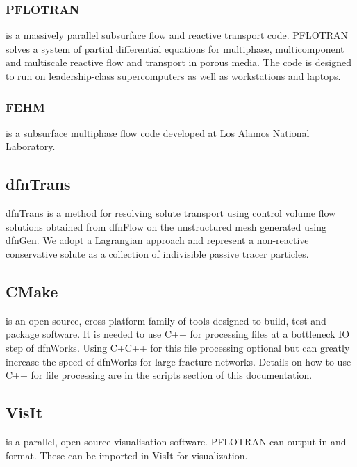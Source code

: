 \documentclass[letterpaper,10pt,english]{sphinxmanual}
\begin{document}
\subsubsection{PFLOTRAN}
\label{\detokenize{intro:pflotran}}
  is a massively parallel subsurface flow and reactive transport
code. PFLOTRAN solves a system of partial differential equations for
multiphase, multicomponent and multiscale reactive flow and transport in
porous media. The code is designed to run on leadership-class supercomputers
as well as workstations and laptops.


\subsubsection{FEHM}
\label{\detokenize{intro:id2}}\label{\detokenize{intro:fehm}}
 is a subsurface multiphase flow code developed at Los Alamos National
Laboratory.


\subsection{dfnTrans}
\label{\detokenize{intro:id3}}\label{\detokenize{intro:dfntrans}}
dfnTrans is a method for resolving solute transport using control volume flow
solutions obtained from dfnFlow on the unstructured mesh generated using
dfnGen. We adopt a Lagrangian approach and represent a non-reactive
conservative solute as a collection of indivisible passive tracer particles.


\subsection{CMake}
\label{\detokenize{intro:cmake}}
 is an open-source, cross-platform family of tools designed to build,
test and package software. It is needed to use C++ for processing files at a
bottleneck IO step of dfnWorks. Using C+C++ for this file processing optional
but can greatly increase the speed of dfnWorks for large fracture networks.
Details on how to use C++ for file processing are in the scripts section of
this documentation.


\subsection{VisIt}
\label{\detokenize{intro:id4}}\label{\detokenize{intro:visit}}
 is a parallel, open-source visualisation software. PFLOTRAN can output
in  and  format. These can be imported in VisIt for visualization.
\end{document}
